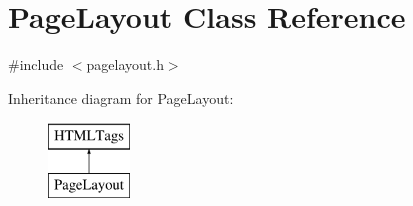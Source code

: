 \hypertarget{classPageLayout}{\section{Page\-Layout Class Reference}
\label{d7/d9e/classPageLayout}
}


{\ttfamily \#include $<$pagelayout.\-h$>$}

Inheritance diagram for Page\-Layout\-:\begin{figure}[H]
\begin{center}
\leavevmode
\includegraphics[height=2.000000cm]{d7/d9e/classPageLayout}
\end{center}
\end{figure}
